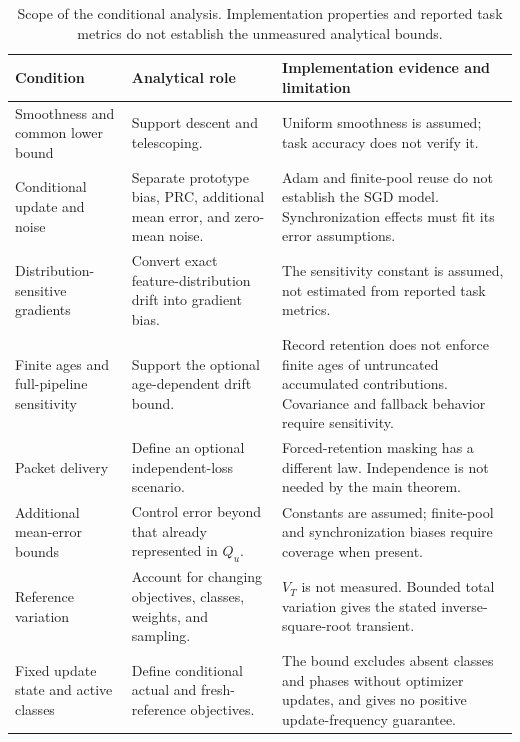 \begin{table}[!ht]
\centering
\footnotesize
\caption{Scope of the conditional analysis. Implementation properties and reported task metrics do not establish the unmeasured analytical bounds.}
\label{tab:analysis_assumptions}
\setlength{\tabcolsep}{4pt}
\begin{tabular}{@{}p{}p{}p{}@{}}
\toprule
Condition & Analytical role & Implementation evidence and limitation \\
\midrule
Smoothness and common lower bound
& Support descent and telescoping.
& Uniform smoothness is assumed; task accuracy does not verify it. \\
Conditional update and noise
& Separate prototype bias, PRC, additional mean error, and zero-mean noise.
& Adam and finite-pool reuse do not establish the SGD model. Synchronization effects must fit its error assumptions. \\
Distribution-sensitive gradients
& Convert exact feature-distribution drift into gradient bias.
& The sensitivity constant is assumed, not estimated from reported task metrics. \\
Finite ages and full-pipeline sensitivity
& Support the optional age-dependent drift bound.
& Record retention does not enforce finite ages of untruncated accumulated contributions. Covariance and fallback behavior require sensitivity. \\
Packet delivery
& Define an optional independent-loss scenario.
& Forced-retention masking has a different law. Independence is not needed by the main theorem. \\
Additional mean-error bounds
& Control error beyond that already represented in $Q_u$.
& Constants are assumed; finite-pool and synchronization biases require coverage when present. \\
Reference variation
& Account for changing objectives, classes, weights, and sampling.
& $V_T$ is not measured. Bounded total variation gives the stated inverse-square-root transient. \\
Fixed update state and active classes
& Define conditional actual and fresh-reference objectives.
& The bound excludes absent classes and phases without optimizer updates, and gives no positive update-frequency guarantee. \\
\bottomrule
\end{tabular}
\end{table}